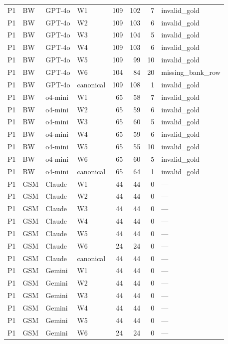 \begin{table}[t]
\begin{tabular}{llllrrrl}
    P1 & BW & GPT-4o & W1 & 109 & 102 & 7 & invalid\_gold \\
    P1 & BW & GPT-4o & W2 & 109 & 103 & 6 & invalid\_gold \\
    P1 & BW & GPT-4o & W3 & 109 & 104 & 5 & invalid\_gold \\
    P1 & BW & GPT-4o & W4 & 109 & 103 & 6 & invalid\_gold \\
    P1 & BW & GPT-4o & W5 & 109 & 99 & 10 & invalid\_gold \\
    P1 & BW & GPT-4o & W6 & 104 & 84 & 20 & missing\_bank\_row \\
    P1 & BW & GPT-4o & canonical & 109 & 108 & 1 & invalid\_gold \\
    P1 & BW & o4-mini & W1 & 65 & 58 & 7 & invalid\_gold \\
    P1 & BW & o4-mini & W2 & 65 & 59 & 6 & invalid\_gold \\
    P1 & BW & o4-mini & W3 & 65 & 60 & 5 & invalid\_gold \\
    P1 & BW & o4-mini & W4 & 65 & 59 & 6 & invalid\_gold \\
    P1 & BW & o4-mini & W5 & 65 & 55 & 10 & invalid\_gold \\
    P1 & BW & o4-mini & W6 & 65 & 60 & 5 & invalid\_gold \\
    P1 & BW & o4-mini & canonical & 65 & 64 & 1 & invalid\_gold \\
    P1 & GSM & Claude & W1 & 44 & 44 & 0 & --- \\
    P1 & GSM & Claude & W2 & 44 & 44 & 0 & --- \\
    P1 & GSM & Claude & W3 & 44 & 44 & 0 & --- \\
    P1 & GSM & Claude & W4 & 44 & 44 & 0 & --- \\
    P1 & GSM & Claude & W5 & 44 & 44 & 0 & --- \\
    P1 & GSM & Claude & W6 & 24 & 24 & 0 & --- \\
    P1 & GSM & Claude & canonical & 44 & 44 & 0 & --- \\
    P1 & GSM & Gemini & W1 & 44 & 44 & 0 & --- \\
    P1 & GSM & Gemini & W2 & 44 & 44 & 0 & --- \\
    P1 & GSM & Gemini & W3 & 44 & 44 & 0 & --- \\
    P1 & GSM & Gemini & W4 & 44 & 44 & 0 & --- \\
    P1 & GSM & Gemini & W5 & 44 & 44 & 0 & --- \\
    P1 & GSM & Gemini & W6 & 24 & 24 & 0 & --- \\

\end{tabular}
\end{table}
